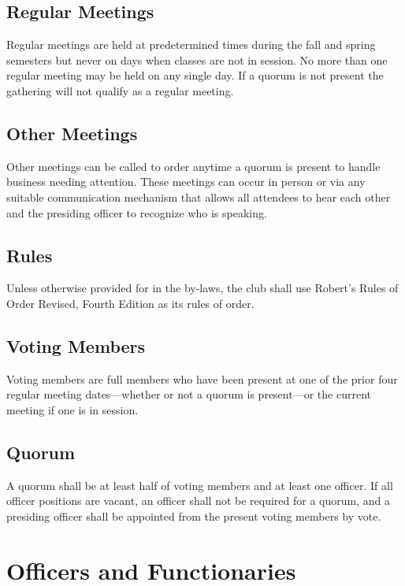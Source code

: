 \documentclass{article}
\begin{document}
\subsection{Regular Meetings}

Regular meetings are held at predetermined times during the fall and spring
semesters but never on days when classes are not in session. No more than one
regular meeting may be held on any single day. If a quorum is not present the
gathering will not qualify as a regular meeting.

\subsection{Other Meetings}

Other meetings can be called to order anytime a quorum is present to handle
business needing attention. These meetings can occur in person or via any
suitable communication mechanism that allows all attendees to hear each other
and the presiding officer to recognize who is speaking.

\subsection{Rules}

Unless otherwise provided for in the by-laws, the club shall use Robert's Rules
of Order Revised, Fourth Edition as its rules of order.

\subsection{Voting Members}

Voting members are full members who have been present at one of the prior four
regular meeting dates---whether or not a quorum is present---or the current
meeting if one is in session.

\subsection{Quorum}

A quorum shall be at least half of voting members and at least one officer. If
all officer positions are vacant, an officer shall not be required for a quorum,
and a presiding officer shall be appointed from the present voting members by
vote.

\section{Officers and Functionaries}
\end{document}
